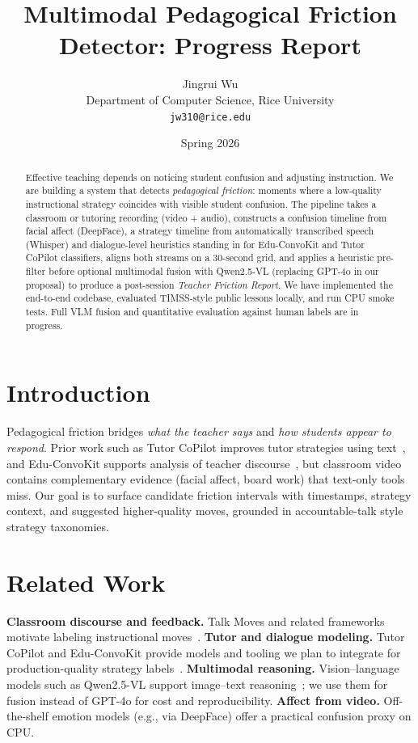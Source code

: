 \documentclass[11pt]{article}
\title{Multimodal Pedagogical Friction Detector: Progress Report}
\author{Jingrui Wu\\
Department of Computer Science, Rice University\\
\texttt{jw310@rice.edu}}
\date{Spring 2026}
\begin{document}
\maketitle

\begin{abstract}
Effective teaching depends on noticing student confusion and adjusting instruction. We are building a system that detects \emph{pedagogical friction}: moments where a low-quality instructional strategy coincides with visible student confusion. The pipeline takes a classroom or tutoring recording (video + audio), constructs a confusion timeline from facial affect (DeepFace), a strategy timeline from automatically transcribed speech (Whisper) and dialogue-level heuristics standing in for Edu-ConvoKit and Tutor CoPilot classifiers, aligns both streams on a 30-second grid, and applies a heuristic pre-filter before optional multimodal fusion with Qwen2.5-VL (replacing GPT-4o in our proposal) to produce a post-session \emph{Teacher Friction Report}. We have implemented the end-to-end codebase, evaluated TIMSS-style public lessons locally, and run CPU smoke tests. Full VLM fusion and quantitative evaluation against human labels are in progress.
\end{abstract}

\section{Introduction}
Pedagogical friction bridges \emph{what the teacher says} and \emph{how students appear to respond}. Prior work such as Tutor CoPilot improves tutor strategies using text~\cite{wang2025tutor}, and Edu-ConvoKit supports analysis of teacher discourse~\cite{wang2024edu}, but classroom video contains complementary evidence (facial affect, board work) that text-only tools miss. Our goal is to surface candidate friction intervals with timestamps, strategy context, and suggested higher-quality moves, grounded in accountable-talk style strategy taxonomies.

\section{Related Work}
\textbf{Classroom discourse and feedback.} Talk Moves and related frameworks motivate labeling instructional moves~\cite{suresh2021talkmoves}. \textbf{Tutor and dialogue modeling.} Tutor CoPilot and Edu-ConvoKit provide models and tooling we plan to integrate for production-quality strategy labels~\cite{wang2025tutor,wang2024edu}. \textbf{Multimodal reasoning.} Vision--language models such as Qwen2.5-VL support image--text reasoning~\cite{qwen25vl}; we use them for fusion instead of GPT-4o for cost and reproducibility. \textbf{Affect from video.} Off-the-shelf emotion models (e.g., via DeepFace) offer a practical confusion proxy on CPU.
\end{document}
